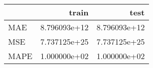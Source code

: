 \begin{tabular}{lrr}
\toprule
{} &         train &          test \\
\midrule
MAE  &  8.796093e+12 &  8.796093e+12 \\
MSE  &  7.737125e+25 &  7.737125e+25 \\
MAPE &  1.000000e+02 &  1.000000e+02 \\
\bottomrule
\end{tabular}
